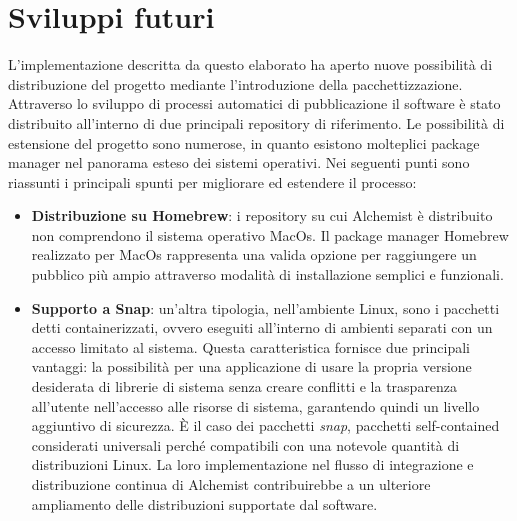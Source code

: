 \section{Sviluppi futuri}
L'implementazione descritta da questo elaborato ha aperto nuove possibilità di distribuzione del progetto mediante l'introduzione della pacchettizzazione. Attraverso lo sviluppo di processi automatici di pubblicazione il software è stato distribuito all'interno di due principali repository di riferimento. Le possibilità di estensione del progetto sono numerose, in quanto esistono molteplici package manager nel panorama esteso dei sistemi operativi. Nei seguenti punti sono riassunti i principali spunti per migliorare ed estendere il processo:
\begin{itemize}
	\item \textbf{Distribuzione su Homebrew}: i repository su cui Alchemist è distribuito non comprendono il sistema operativo MacOs. Il package manager Homebrew realizzato per MacOs rappresenta una valida opzione per raggiungere un pubblico più ampio attraverso modalità di installazione semplici e funzionali.
	\item \textbf{Supporto a Snap}: un'altra tipologia, nell'ambiente Linux, sono i pacchetti detti containerizzati, ovvero eseguiti all'interno di ambienti separati con un accesso limitato al sistema. Questa caratteristica fornisce due principali vantaggi: la possibilità per una applicazione di usare la propria versione desiderata di librerie di sistema senza creare conflitti e la trasparenza all'utente nell'accesso alle risorse di sistema, garantendo quindi un livello aggiuntivo di sicurezza. È il caso dei pacchetti \textit{snap}, pacchetti self-contained considerati universali perché compatibili con una notevole quantità di distribuzioni Linux. La loro implementazione nel flusso di integrazione e distribuzione continua di Alchemist contribuirebbe a un ulteriore ampliamento delle distribuzioni supportate dal software. 
\end{itemize}
